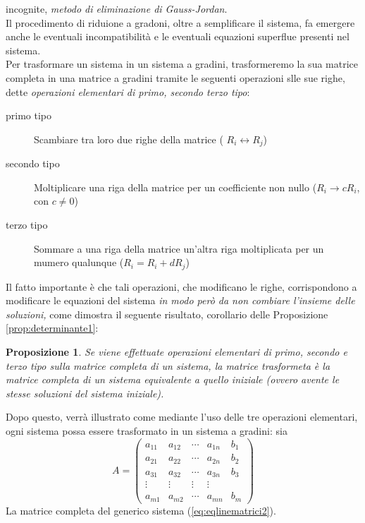 \documentclass{book}
\theoremstyle{definition}
\theoremstyle{plain}
\newtheorem{prop}{Proposizione}[section]
\begin{document}
incognite, \textit{metodo di eliminazione di Gauss-Jordan}.\\
Il procedimento di riduione a gradoni, oltre a semplificare il sistema, fa
emergere anche le eventuali incompatibilità e le eventuali equazioni
superflue presenti nel sistema.\\
Per trasformare un sistema in un sistema a gradini, trasformeremo la sua
matrice completa in una matrice a gradini tramite le seguenti operazioni
slle sue righe, dette \textit{operazioni elementari di primo, secondo
  terzo tipo}:
\begin{description}
\item[primo tipo] Scambiare tra loro due righe della matrice (
  $R_i \leftrightarrow R_j$)
\item[secondo tipo] Moltiplicare una riga della matrice per un
  coefficiente non nullo ($R_i\to cR_i$, con $c\neq 0$)
\item[terzo tipo] Sommare a una riga della matrice un'altra riga
  moltiplicata per un mumero qualunque ($R_i=R_i+dR_j$)
\end{description}
Il fatto importante è che tali operazioni, che modificano le righe,
corrispondono a modificare le equazioni del sistema \textit{in modo però
  da non combiare l'insieme delle soluzioni,} come dimostra il seguente
risultato, corollario delle Proposizione \ref{prop:determinante1}:
\begin{prop}
  \label{prop:determinante2}
  Se viene effettuate operazioni elementari di primo, secondo e terzo
  tipo sulla matrice completa di un sistema, la matrice trasformeta è la
  matrice completa di un sistema \textit{equivalente} a quello iniziale
  (ovvero avente le stesse soluzioni del sistema iniziale).
\end{prop}
Dopo questo, verrà illustrato come mediante l'uso delle tre operazioni
elementari, ogni sistema possa essere trasformato in un sistema a gradini:
sia
\begin{equation}
  \label{eq:gauss-jorda4}
  A=
  \begin{pmatrix}
    a_{11} & a_{12} & \cdots & a_{1n} & b_1\\
    a_{21} & a_{22} & \cdots & a_{2n} & b_2\\
    a_{31} & a_{32} & \cdots & a_{3n} & b_3\\
    \vdots & \vdots & \vdots & \vdots\\
    a_{m1} & a_{m2} & \cdots & a_{mn} & b_m
  \end{pmatrix}
\end{equation}
La matrice completa del generico sistema (\ref{eq:eqlinematrici2}).\\
\end{document}
